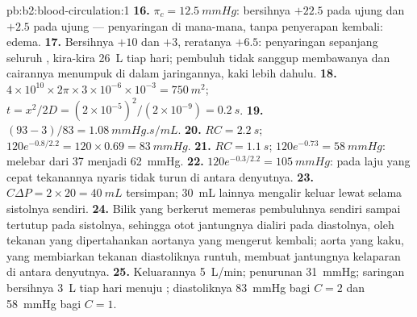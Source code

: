 \begin{solution}{pb:b2:blood-circulation:1}
\textbf{16.} $\pi_c = \qty{12.5}{mmHg}$: bersihnya $+22.5$ pada ujung
 dan $+2.5$ pada ujung  --- penyaringan di mana-mana,
tanpa penyerapan kembali: edema.
\textbf{17.} Bersihnya $+10$ dan $+3$, reratanya $+6.5$: penyaringan
sepanjang seluruh , kira-kira \qty{26}{L} tiap hari; pembuluh
 tidak sanggup membawanya dan cairannya menumpuk di
dalam jaringannya, kaki lebih dahulu.
\textbf{18.} $4\times 10^{10}\times 2\pi\times 3\times 10^{-6}\times
10^{-3} = \qty{750}{m^2}$; $t = x^{2}/2D = (2\times 10^{-5})^{2}/
(2\times 10^{-9}) = \qty{0.2}{s}$.
\textbf{19.} $(93 - 3)/83 = \qty{1.08}{mmHg.s/mL}$.
\textbf{20.} $RC = \qty{2.2}{s}$; $120e^{-0.8/2.2} = 120\times 0.69 =
\qty{83}{mmHg}$.
\textbf{21.} $RC = \qty{1.1}{s}$; $120e^{-0.73} = \qty{58}{mmHg}$:
 melebar dari 37 menjadi \qty{62}{mmHg}.
\textbf{22.} $120e^{-0.3/2.2} = \qty{105}{mmHg}$: pada laju yang cepat
tekanannya nyaris tidak turun di antara denyutnya.
\textbf{23.} $C\Delta P = 2\times 20 = \qty{40}{mL}$ tersimpan;
\qty{30}{mL} lainnya mengalir keluar lewat  selama sistolnya sendiri.
\textbf{24.} Bilik yang berkerut memeras pembuluhnya sendiri sampai
tertutup pada sistolnya, sehingga otot jantungnya dialiri pada
diastolnya, oleh tekanan yang dipertahankan aortanya yang mengerut
kembali; aorta yang kaku, yang membiarkan tekanan diastoliknya runtuh,
membuat jantungnya kelaparan di antara denyutnya.
\textbf{25.} Keluarannya \qty{5}{L/min}; penurunan 
\qty{31}{mmHg}; saringan bersihnya \qty{3}{L} tiap hari menuju ; diastoliknya \qty{83}{mmHg} bagi $C = 2$ dan \qty{58}{mmHg}
bagi $C = 1$.
\end{solution}
